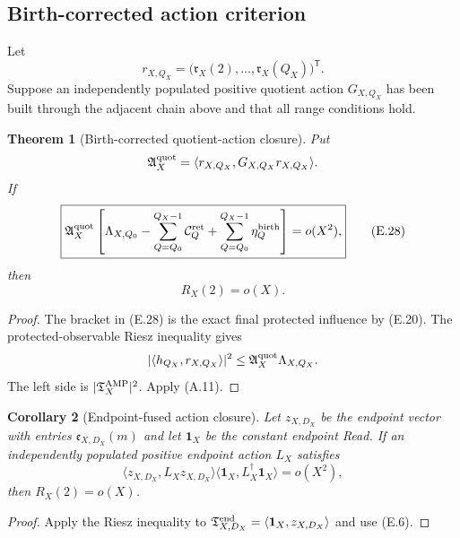 \documentclass[11pt]{article}
\newtheorem{theorem}{Theorem}[section]
\newtheorem{corollary}[theorem]{Corollary}
\theoremstyle{definition}
\theoremstyle{remark}
\newcommand{\one}{\mathbf 1}
\begin{document}
\subsection{Birth-corrected action criterion}
\label{subsec:affend-action-criterion}

Let
\[
 r_{X,Q_X}
 =\bigl(\mathfrak r_X(2),\ldots,\mathfrak r_X(Q_X)\bigr)^{\mathsf T}.
\]
Suppose an independently populated positive quotient action $G_{X,Q_X}$ has
been built through the adjacent chain above and that all range conditions
hold.

\begin{theorem}[Birth-corrected quotient-action closure]
\label{thm:affend-birth-corrected-closure}
Put
\[
 \mathfrak A_X^{\rm quot}
 =\langle r_{X,Q_X},G_{X,Q_X}r_{X,Q_X}\rangle.
\]
If
\begin{equation}
 \label{eq:affend-birth-corrected-criterion}
 \boxed{
 \mathfrak A_X^{\rm quot}
 \left[
  \Lambda_{X,Q_0}
  -\sum_{Q=Q_0}^{Q_X-1}\mathcal C_Q^{\rm ret}
  +\sum_{Q=Q_0}^{Q_X-1}\eta_Q^{\rm birth}
 \right]
 =o(X^2),}
 \tag{E.28}
\end{equation}
then
\[
 R_X(2)=o(X).
\]
\end{theorem}

\begin{proof}
The bracket in \textup{(E.28)} is the exact final protected influence by
\textup{(E.20)}.  The protected-observable Riesz inequality gives
\[
 |\langle h_{Q_X},r_{X,Q_X}\rangle|^2
 \le
 \mathfrak A_X^{\rm quot}\Lambda_{X,Q_X}.
\]
The left side is $|\mathfrak T_X^{\rm AMP}|^2$.  Apply \textup{(A.11)}.
\end{proof}

\begin{corollary}[Endpoint-fused action closure]
\label{cor:affend-endpoint-action-closure}
Let $z_{X,D_X}$ be the endpoint vector with entries
$\mathfrak e_{X,D_X}(m)$ and let $\one_X$ be the constant endpoint Read.  If an
independently populated positive endpoint action $L_X$ satisfies
\begin{equation}
 \label{eq:affend-endpoint-action-closure}
 \boxed{
 \langle z_{X,D_X},L_Xz_{X,D_X}\rangle
 \langle\one_X,L_X^{\dagger}\one_X\rangle
 =o(X^2),}
 \tag{E.29}
\end{equation}
then $R_X(2)=o(X)$.
\end{corollary}

\begin{proof}
Apply the Riesz inequality to
$\mathfrak T_{X,D_X}^{\rm end}=\langle\one_X,z_{X,D_X}\rangle$ and use
\textup{(E.6)}.
\end{proof}
\end{document}
